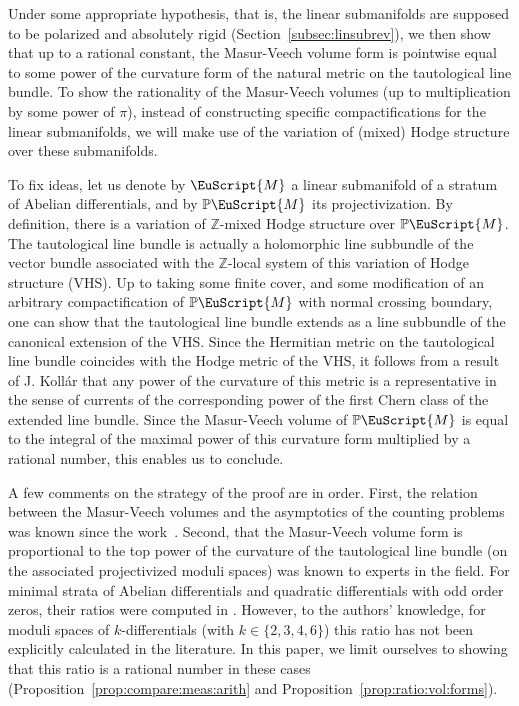 \documentclass[10pt]{amsart}
\let\mathcal\EuScript
\theoremstyle{plain}
\theoremstyle{definition}
\newcommand\Z{\mathbb{Z}}
\newcommand{\Pb}{\mathbb{P}}
\newcommand{\cM}{\mathcal{M}}
\begin{document}
Under some appropriate hypothesis, that is, the linear submanifolds are supposed to be polarized and absolutely rigid (\cf Section~\ref{subsec:linsubrev}), we then show that up to a rational constant, the Masur-Veech volume form is pointwise equal to some power of the curvature form of the natural metric on the tautological line bundle.
To show the rationality of the Masur-Veech volumes (up to multiplication by some power of $\pi$), instead of constructing specific compactifications for the linear submanifolds, we will make use of the variation of (mixed) Hodge structure over these submanifolds.

To fix ideas, let us denote by $\cM$ a linear submanifold of a stratum of Abelian differentials, and by $\Pb\cM$ its projectivization.
By definition, there is a variation of $\Z$-mixed Hodge structure over $\Pb\cM$.
The tautological line bundle is actually a holomorphic line subbundle of the vector bundle associated with the $\Z$-local system of this variation of Hodge structure (VHS).
Up to taking some finite cover, and some modification of an arbitrary compactification of $\Pb\cM$ with normal crossing boundary, one can show that the tautological line bundle extends as a line subbundle of the canonical extension of the VHS.
Since the Hermitian metric on the tautological line bundle coincides with the Hodge metric of the VHS, it follows from a result of J. Kollár \cite{Kollar87} that any power of the curvature of this metric is a representative in the sense of currents of the corresponding power of the first Chern class of the extended line bundle. Since the Masur-Veech volume of $\Pb\cM$ is equal to the integral of the maximal power of this curvature form multiplied by a rational number, this enables us to conclude.

A few comments on the strategy of the proof are in order. First, the relation between the Masur-Veech volumes and the asymptotics of the counting problems was known since the work~\cite{EO01}. Second, that the Masur-Veech volume form is proportional to the top power of the curvature of the tautological line bundle (on the associated projectivized moduli spaces) was known to experts in the field.
For minimal strata of Abelian differentials and quadratic differentials with odd order zeros, their ratios were computed in \cite{Sau18, CMS19}.
However, to the authors' knowledge, for moduli spaces of $k$-differentials (with $k\in \{2,3,4,6\}$) this ratio has not been explicitly calculated in the literature.
In this paper, we limit ourselves to showing that this ratio is a rational number in these cases (\cf Proposition~\ref{prop:compare:meas:arith} and Proposition~\ref{prop:ratio:vol:forms}).
\end{document}
